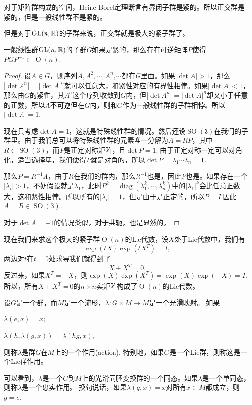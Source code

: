 \begin{pro}
对于矩阵群构成的空间，Heine-Borel定理断言有界闭子群是紧的。所以正交群是紧的，但是一般线性群不是紧的。
\end{pro}

但是对于$\operatorname{GL}(n,\mathbb{R})$的子群来说，正交群就是极大的紧子群了。

\begin{pro}
一般线性群$\operatorname{GL}(n,\mathbb{R})$的子群$G$如果是紧的，那么存在可逆矩阵$P$使得$PGP^{-1}\subset \operatorname{O}(n)$.
\end{pro} 

\begin{proof}
设$A\in G$，则序列$A,A^2,\cdots,A^n,\cdots$都在$G$里面。如果$|\det A|>1$，那么$|\det A^n|=|\det A|^n$就可以任意大，和紧性对应的有界性相悖。如果$|\det A|<1$，那么由$G$的紧性，其$A^n$这个序列收敛到$G$内，但$|\det A^n|=|\det A|^n$却又小于任意的正数，所以$A$不可逆但在$G$内，则和$G$作为一般线性群的子群相悖。所以$|\det A|=1$.

现在只考虑$\det A=1$，这就是特殊线性群的情况。然后还设$\operatorname{SO}(3)$在我们的子群里。由于我们总可以将特殊线性群的元素唯一分解为$A=RP$，其中$R\in \operatorname{SO}(3)$，而$P$是正定对称矩阵，且$\det P=1$. 由于正定对称一定可以对角化，适当选择基，我们使得$P$就是对角的，所以$\det P=\lambda_1\cdots\lambda_n=1$.

那么$P=R^{-1}A$，由于$R$在我们的群内，那么$R^{-1}$也是，因此$P$也是。如果存在一个$|\lambda_i|>1$，不妨假设就是$\lambda_1$，此时$P^{k}=\operatorname{diag}(\lambda_1^k,\cdots,\lambda_n^k)$中的$|\lambda_1|^k$会比任意正数大，这和紧性相悖。所以所有的$|\lambda_i|=1$，但是由于是正定的，所以$P=I$.因此$A=R\in\operatorname{SO}(3)$.

对于$\det A=-1$的情况类似，对于共轭，也是显然的。 
\end{proof}

现在我们来求这个极大的紧子群$\operatorname{O}(n)$的Lie代数，设$X$处于Lie代数中，我们有
\[
	\exp(tX)\exp(tX^T)=I,
\]
两边对$t$在$t=0$处求导我们就得到了
\[
	X+X^T=0.
\]
反过来，如果$X^T=-X$，则$\exp(X)\exp(X^T)=\exp(X)\exp(-X)=I$. 所以，所有$X+X^T=0$的$n\times n$实矩阵构成了$\operatorname{O}(n)$的Lie代数。

\begin{para}[群作用]
设$G$是一个群，而$M$是一个流形，$\lambda:G\times M\to M$是一个光滑映射。
如果
\begin{compactenum}
\item $\lambda(e,x)=x$;
\item $\lambda(h,\lambda(g,x))=\lambda(hg,x)$,
\end{compactenum}
则称$\lambda$是群$G$在$M$上的一个作用(action). 特别地，如果$G$是一个Lie群，则称这是一个Lie群作用。

可以看到，$\lambda$是一个$G$到$M$上的光滑同胚变换群的一个同态。如果$\lambda$是一个单同态，则称$\lambda$是一个忠实作用。
换句说话，如果$\lambda(g,x)=x$对所有$x\in M$都成立，则$g=e$. 
\end{para}

